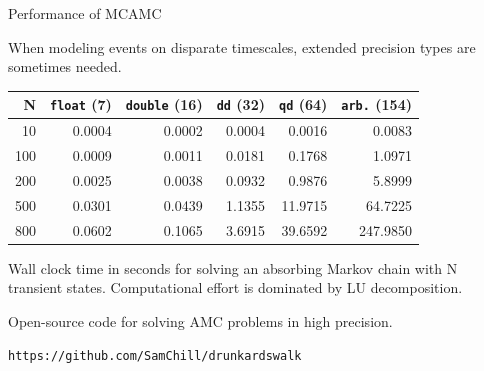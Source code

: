 \documentclass[onlymath]{beamer}
\begin{document}
\begin{frame}{Performance of MCAMC}

When modeling events on disparate timescales, extended precision types are sometimes needed.

\begin{center}
\begin{tabular}{ r r r r r r}
\hline
N   & \texttt{float} (7) & \texttt{double} (16) & \texttt{dd} (32) & \texttt{qd} (64) & \texttt{arb.} (154) \\
\hline
10  & 0.0004 & 0.0002 & 0.0004  & 0.0016  & 0.0083 \\
100 & 0.0009 & 0.0011 & 0.0181  & 0.1768  & 1.0971 \\
200 & 0.0025 & 0.0038 & 0.0932  & 0.9876  & 5.8999 \\
500 & 0.0301 & 0.0439 & 1.1355  & 11.9715 & 64.7225 \\
800 & 0.0602 & 0.1065 & 3.6915  & 39.6592 & 247.9850 \\
\hline
\end{tabular}
\end{center}

Wall clock time in seconds for solving an absorbing Markov chain with N transient states. Computational effort is dominated by LU decomposition.

 \begin{tcolorbox}[title=Drunkard's Walk,colback=white,colframe=black,]
Open-source code for solving AMC problems in high precision.

\texttt{https://github.com/SamChill/drunkardswalk}
\end{tcolorbox}

\end{frame}
\end{document}
